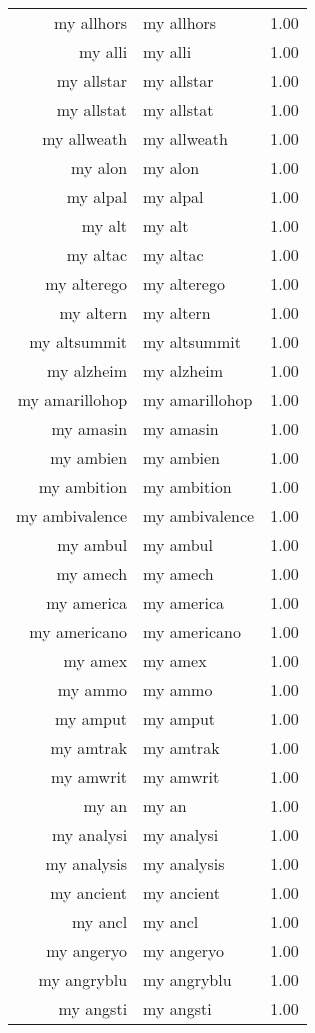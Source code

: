 \begin{table}[ht]
\begin{tabular}{rlr}
  my allhors & my allhors & 1.00 \\ 
  my alli & my alli & 1.00 \\ 
  my allstar & my allstar & 1.00 \\ 
  my allstat & my allstat & 1.00 \\ 
  my allweath & my allweath & 1.00 \\ 
  my alon & my alon & 1.00 \\ 
  my alpal & my alpal & 1.00 \\ 
  my alt & my alt & 1.00 \\ 
  my altac & my altac & 1.00 \\ 
  my alterego & my alterego & 1.00 \\ 
  my altern & my altern & 1.00 \\ 
  my altsummit & my altsummit & 1.00 \\ 
  my alzheim & my alzheim & 1.00 \\ 
  my amarillohop & my amarillohop & 1.00 \\ 
  my amasin & my amasin & 1.00 \\ 
  my ambien & my ambien & 1.00 \\ 
  my ambition & my ambition & 1.00 \\ 
  my ambivalence & my ambivalence & 1.00 \\ 
  my ambul & my ambul & 1.00 \\ 
  my amech & my amech & 1.00 \\ 
  my america & my america & 1.00 \\ 
  my americano & my americano & 1.00 \\ 
  my amex & my amex & 1.00 \\ 
  my ammo & my ammo & 1.00 \\ 
  my amput & my amput & 1.00 \\ 
  my amtrak & my amtrak & 1.00 \\ 
  my amwrit & my amwrit & 1.00 \\ 
  my an & my an & 1.00 \\ 
  my analysi & my analysi & 1.00 \\ 
  my analysis & my analysis & 1.00 \\ 
  my ancient & my ancient & 1.00 \\ 
  my ancl & my ancl & 1.00 \\ 
  my angeryo & my angeryo & 1.00 \\ 
  my angryblu & my angryblu & 1.00 \\ 
  my angsti & my angsti & 1.00 \\ 

\end{tabular}
\end{table}

